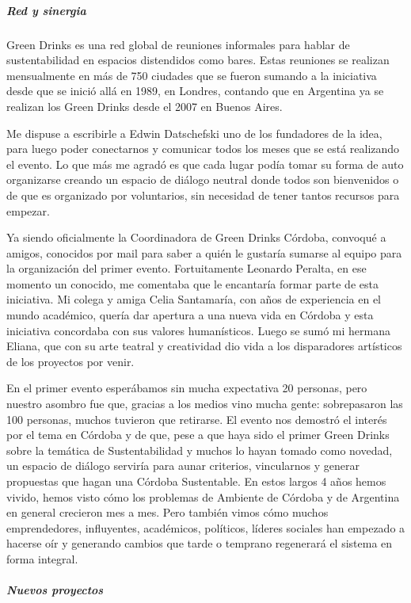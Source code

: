 \documentclass[
]{article}
\begin{document}
\hypertarget{red-y-sinergia}{%
\subparagraph{Red y sinergia}\label{red-y-sinergia}}

Green Drinks es una red global de reuniones informales para hablar de
sustentabilidad en espacios distendidos como bares. Estas reuniones se
realizan mensualmente en más de 750 ciudades que se fueron sumando a la
iniciativa desde que se inició allá en 1989, en Londres, contando que en
Argentina ya se realizan los Green Drinks desde el 2007 en Buenos Aires.

Me dispuse a escribirle a Edwin Datschefski uno de los fundadores de la
idea, para luego poder conectarnos y comunicar todos los meses que se
está realizando el evento. Lo que más me agradó es que cada lugar podía
tomar su forma de auto organizarse creando un espacio de diálogo neutral
donde todos son bienvenidos o de que es organizado por voluntarios, sin
necesidad de tener tantos recursos para empezar.

Ya siendo oficialmente la Coordinadora de Green Drinks Córdoba, convoqué
a amigos, conocidos por mail para saber a quién le gustaría sumarse al
equipo para la organización del primer evento. Fortuitamente Leonardo
Peralta, en ese momento un conocido, me comentaba que le encantaría
formar parte de esta iniciativa. Mi colega y amiga Celia Santamaría, con
años de experiencia en el mundo académico, quería dar apertura a una
nueva vida en Córdoba y esta iniciativa concordaba con sus valores
humanísticos. Luego se sumó mi hermana Eliana, que con su arte teatral y
creatividad dio vida a los disparadores artísticos de los proyectos por
venir.

En el primer evento esperábamos sin mucha expectativa 20 personas, pero
nuestro asombro fue que, gracias a los medios vino mucha gente:
sobrepasaron las 100 personas, muchos tuvieron que retirarse. El evento
nos demostró el interés por el tema en Córdoba y de que, pese a que haya
sido el primer Green Drinks sobre la temática de Sustentabilidad y
muchos lo hayan tomado como novedad, un espacio de diálogo serviría para
aunar criterios, vincularnos y generar propuestas que hagan una Córdoba
Sustentable. En estos largos 4 años hemos vivido, hemos visto cómo los
problemas de Ambiente de Córdoba y de Argentina en general crecieron mes
a mes. Pero también vimos cómo muchos emprendedores, influyentes,
académicos, políticos, líderes sociales han empezado a hacerse oír y
generando cambios que tarde o temprano regenerará el sistema en forma
integral.

\hypertarget{nuevos-proyectos}{%
\subparagraph{Nuevos proyectos}\label{nuevos-proyectos}}
\end{document}
